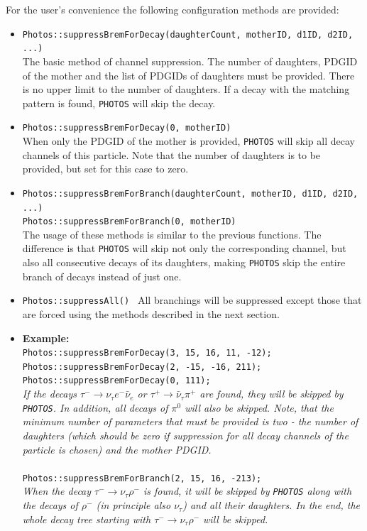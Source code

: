\documentclass[]{Photos_interface_design}
\begin{document}
For the user's convenience the following configuration methods are provided:
\begin{itemize}
 \item {\tt Photos::suppressBremForDecay(daughterCount, motherID, d1ID, d2ID, ...)} \hfill \\
       The basic method of channel suppression. The number of daughters,
	   PDGID of the mother and the list of PDGIDs of daughters must be provided.
	   There is no upper limit to the number of daughters.
	   If a decay with the matching pattern is found, {\tt PHOTOS} will skip the decay.
 \item {\tt Photos::suppressBremForDecay(0, motherID)} \hfill \\
       When only the PDGID of the mother is provided, {\tt PHOTOS} will skip all decay channels
	   of this particle. Note that the number of daughters is to be provided,
	   but  set for  this case to zero.
 \item {\tt Photos::suppressBremForBranch(daughterCount, motherID, d1ID, d2ID, ...)} \hfill \\
       {\tt Photos::suppressBremForBranch(0, motherID)} \hfill \\
       The usage of these methods is similar to the previous functions. The difference is
	   that {\tt PHOTOS} will skip not only the corresponding channel,
	   but also all consecutive decays of its daughters, making {\tt PHOTOS} skip the entire branch
	   of decays instead of just one.
 \item {\tt Photos::suppressAll() }
       All branchings will be suppressed except those that are forced using the methods
	   described in the next section.
 \item \textbf{Example:} \hfill \\
{\tt Photos::suppressBremForDecay(3, 15, 16, 11, -12); } \\
{\tt Photos::suppressBremForDecay(2, -15, -16, 211); } \\
{\tt Photos::suppressBremForDecay(0, 111); } \\
\emph{If the decays $\tau^- \rightarrow \nu_\tau e^- \bar \nu_e$ or
      $\tau^+ \rightarrow \bar \nu_\tau \pi^+$ are found, they will be skipped by {\tt PHOTOS}.
	  In addition, all decays of $\pi^0$ will also be skipped. Note, that the minimum
	  number of parameters that must be provided is two - the number of daughters
	  (which should be zero if suppression for all decay channels of the particle is chosen) 
	  and the mother PDGID.} \\ \\
{\tt Photos::suppressBremForBranch(2, 15, 16, -213); } \\
\emph{When the decay $\tau^- \rightarrow \nu_\tau \rho^-$ is found, it will be skipped by
      {\tt PHOTOS} along with the decays of   $\rho^-$ 
(in principle also $\nu_\tau$) and all
	  their daughters. In the end, the whole decay tree starting with
	  $\tau^- \rightarrow \nu_\tau \rho^-$ will be skipped.}
\end{itemize}
\end{document}
